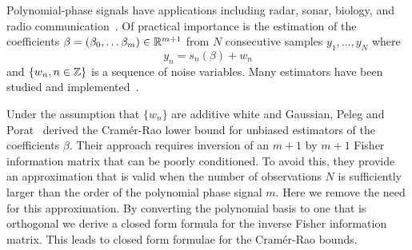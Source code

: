 \documentclass[review]{elsarticle}
\begin{document}
Polynomial-phase signals have applications including radar, sonar, biology, and radio communication~\cite{Angeby_estimating_2000,Levanon_Radar_signals_2004}.  %
Of practical importance is the estimation of the coefficients $\beta = (\beta_0, \dots \beta_m)\in{\mathbb R}^{m+1}$ from $N$ consecutive samples $y_1, \dots, y_N$ where 
\begin{equation}\label{eq:yndatamodel}
y_n = s_n(\beta) + w_n
\end{equation}
and $\{w_n, n \in {\mathbb Z}\}$ is a sequence of noise variables.  Many estimators have been studied and implemented~\cite{Angeby_estimating_2000,Oshea_cpf_2004,Morelande_bayes_unwrapping_2009_tsp,Kitchen_polyphase_unwrapping_1994,Peleg_DPT_1995, Djuric_phase_unwrap_chirp_1990}.  


Under the assumption that $\{w_n\}$ are additive white and Gaussian, Peleg and Porat~\cite{Peleg1991_CRB_PPS_1991} derived the Cram\'{e}r-Rao lower bound for unbiased estimators of the coefficients $\beta$.  Their approach requires inversion of an $m+1$ by $m+1$ Fisher information matrix that can be poorly conditioned.  To avoid this, they provide an approximation that is valid when the number of observations $N$ is sufficiently larger than the order of the polynomial phase signal $m$.  Here we remove the need for this approximation.  By converting the polynomial basis to one that is orthogonal we derive a closed form formula for the inverse Fisher information matrix.  This leads to closed form formulae for the Cram\'{e}r-Rao bounds.  %
\end{document}
